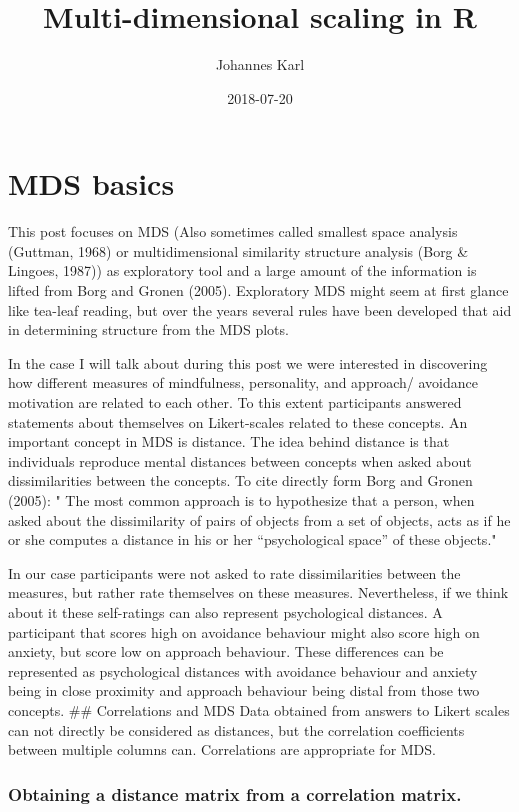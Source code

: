 \documentclass[]{article}
\title{Multi-dimensional scaling in R}
\author{Johannes Karl}
\date{2018-07-20}
\begin{document}
\maketitle

\section{MDS basics}\label{mds-basics}

This post focuses on MDS (Also sometimes called smallest space analysis
(Guttman, 1968) or multidimensional similarity structure analysis (Borg
\& Lingoes, 1987)) as exploratory tool and a large amount of the
information is lifted from Borg and Gronen (2005). Exploratory MDS might
seem at first glance like tea-leaf reading, but over the years several
rules have been developed that aid in determining structure from the MDS
plots.

In the case I will talk about during this post we were interested in
discovering how different measures of mindfulness, personality, and
approach/ avoidance motivation are related to each other. To this extent
participants answered statements about themselves on Likert-scales
related to these concepts. An important concept in MDS is distance. The
idea behind distance is that individuals reproduce mental distances
between concepts when asked about dissimilarities between the concepts.
To cite directly form Borg and Gronen (2005): " The most common approach
is to hypothesize that a person, when asked about the dissimilarity of
pairs of objects from a set of objects, acts as if he or she computes a
distance in his or her ``psychological space'' of these objects."

In our case participants were not asked to rate dissimilarities between
the measures, but rather rate themselves on these measures.
Nevertheless, if we think about it these self-ratings can also represent
psychological distances. A participant that scores high on avoidance
behaviour might also score high on anxiety, but score low on approach
behaviour. These differences can be represented as psychological
distances with avoidance behaviour and anxiety being in close proximity
and approach behaviour being distal from those two concepts. \#\#
Correlations and MDS Data obtained from answers to Likert scales can not
directly be considered as distances, but the correlation coefficients
between multiple columns can. Correlations are appropriate for MDS.

\subsubsection{Obtaining a distance matrix from a correlation
matrix.}\label{obtaining-a-distance-matrix-from-a-correlation-matrix.}
\end{document}
